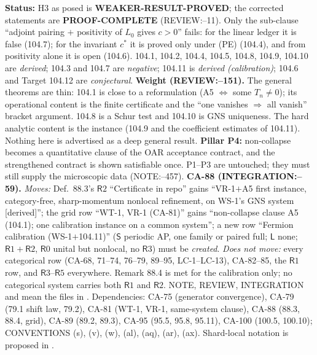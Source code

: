 \textbf{Status:} H3 as posed is \textbf{WEAKER-RESULT-PROVED}; the corrected statements are \textbf{PROOF-COMPLETE} (REVIEW:--11).
Only the sub-clause ``adjoint pairing \(+\) positivity of \(L_0\) gives \(c>0\)'' fails: for the linear ledger it is false
(104.7); for the invariant \(c^*\) it is proved only under (PE) (104.4), and from positivity alone it is open (104.6).
104.1, 104.2, 104.4, 104.5, 104.8, 104.9, 104.10 are \emph{derived}; 104.3 and 104.7 are \emph{negative};
104.11 is \emph{derived (calibration)}; 104.6 and Target 104.12 are \emph{conjectural}.
\textbf{Weight (REVIEW:--151).} The general theorems are thin: 104.1 is close to a reformulation
(A5 \(\Leftrightarrow\) some \(T_n\neq0\)); its operational content is the finite certificate and the ``one vanishes \(\Rightarrow\) all
vanish'' bracket argument. 104.8 is a Schur test and 104.10 is GNS uniqueness. The hard analytic content is the
instance (104.9 and the coefficient estimates of 104.11). Nothing here is advertised as a deep general result.
\textbf{Pillar P4:} non-collapse becomes a quantitative clause of the OAR acceptance contract, and the strengthened
contract is shown satisfiable once. P1--P3 are untouched; they must still supply the microscopic data (NOTE:--457).
\textbf{CA-88 (INTEGRATION:--59).} \emph{Moves:} Def.~88.3's \(\mathsf R2\) ``Certificate in repo'' gains
``VR-1\(+\)A5 first instance, category-free, sharp-momentum nonlocal refinement, on WS-1's GNS system [derived]''; the
grid row ``WT-1, VR-1 (CA-81)'' gains ``non-collapse clause A5 (104.1); one calibration instance on a common system'';
a new row ``Fermion calibration (WS-1\(+\)104.11)'' (\(\mathsf S\) periodic AP, one family or paired full; \(\mathsf L\) none;
\(\mathsf R1+\mathsf R2\), \(\mathsf R0\) unital but nonlocal, no \(\mathsf R3\)) must be \emph{created}. \emph{Does not move:} every
categorical row (CA-68, 71--74, 76--79, 89--95, LC-1--LC-13), CA-82--85, the \(\mathsf R1\) row, and \(\mathsf R3\)--\(\mathsf R5\) everywhere.
Remark 88.4 is met for the calibration only; no categorical system carries both \(\mathsf R1\) and \(\mathsf R2\).
NOTE, REVIEW, INTEGRATION and  mean the files in .
Dependencies: CA-75 (generator convergence), CA-79 (79.1 shift law, 79.2), CA-81 (WT-1, VR-1, same-system clause),
CA-88 (88.3, 88.4, grid), CA-89 (89.2, 89.3), CA-95 (95.5, 95.8, 95.11), CA-100 (100.5, 100.10);
CONVENTIONS (s), (v), (w), (al), (aq), (ar), (ax). Shard-local notation is proposed in .

